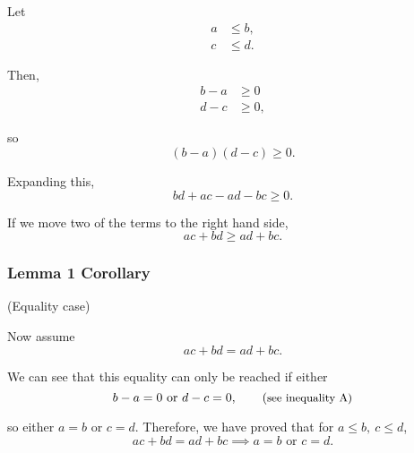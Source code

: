 \documentclass[12pt]{article}
\begin{document}
\begin{solution}{2}
    Let
    \begin{align*}
        a &\le b, \\
        c &\le d.
    \end{align*}
    
    Then,
    \begin{align*}
        b-a &\ge 0 \\
        d-c &\ge 0,
    \end{align*}
    
    so
    \begin{equation*}
        (b-a)(d-c) \ge 0. \tag{A}
    \end{equation*}
    
    Expanding this,
    \begin{equation*}
        bd+ac - ad - bc \ge 0.
    \end{equation*}
    
    If we move two of the terms to the right hand side,
    \begin{equation*}
        ac + bd \ge ad + bc. \tag*{\qed}
    \end{equation*}
    
    \subsubsection*{Lemma 1 Corollary}
    (Equality case)
    
    Now assume
    \begin{equation*}
        ac+bd=ad+bc.
    \end{equation*}
    
    We can see that this equality can only be reached if either
    \begin{equation*}
        b-a = 0
        \text{ or }
        d-c = 0,
        \tag{\small{see inequality A}}
    \end{equation*}
    
    so either $a=b$ or $c=d$. Therefore, we have proved that for $a\le b,\ c\le d$,
    \begin{equation*}
        ac+bd=ad+bc \implies a=b \text{ or } c=d. \tag*{\qed}
    \end{equation*}
    
\end{solution}
\end{document}
